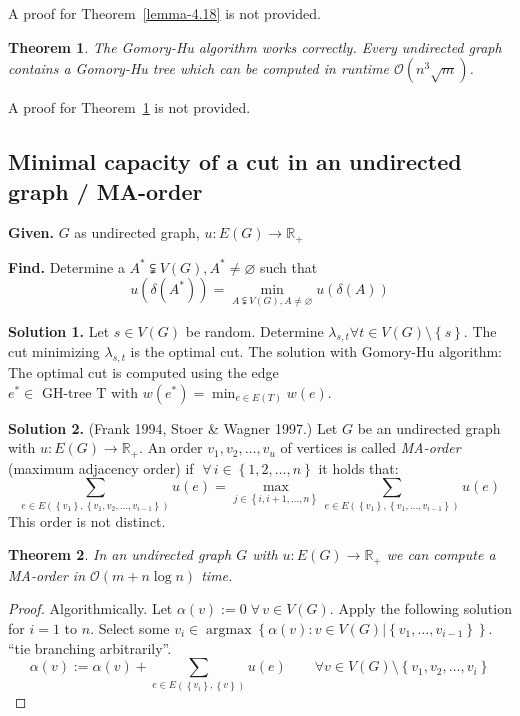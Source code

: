\documentclass{article}
\newtheorem{theorem}{Theorem}
\newcommand{\set}[1]{\left\{#1\right\}}
\newcommand{\given}[1]{\textbf{Given.} #1\par}
\newcommand{\find}[1]{\textbf{Find.} #1\par}
\newcommand{\fall}{\;\forall\,}
\newcommand{\noproof}[1]{A proof for Theorem~\ref{#1} is not provided.}
\DeclareMathOperator{\argmax}{argmax}
\begin{document}
\noproof{lemma-4.18}

\begin{theorem}\label{satz-4.19}
  The Gomory-Hu algorithm works correctly.
  Every undirected graph contains a Gomory-Hu tree which can be computed in runtime $\mathcal{O}(n^3 \sqrt{m})$.
\end{theorem}

\noproof{satz-4.19}

\subsection{Minimal capacity of a cut in an undirected graph / MA-order}

\given{$G$ as undirected graph, $u: E(G) \rightarrow \mathbb{R}_+$}
\find{
  Determine a $A^* \subsetneqq V(G), A^* \neq \diameter$ such that
  \[
    u(\delta(A^*)) = \min_{A \subsetneqq V(G), A \neq \diameter} u(\delta(A))
  \]
}

\textbf{Solution 1.}
  Let $s \in V(G)$ be random. Determine $\lambda_{s,t} \forall t \in V(G) \setminus \set{s}$.
  The cut minimizing $\lambda_{s,t}$ is the optimal cut.
  The solution with Gomory-Hu algorithm: The optimal cut is computed using the edge $e^* \in \text{ GH-tree T with } w(e^*) = \min_{e \in E(T)} w(e)$.

\textbf{Solution 2.}
  (Frank 1994, Stoer \& Wagner 1997.)
  Let $G$ be an undirected graph with $u: E(G) \rightarrow \mathbb{R}_+$.
  An order $v_1, v_2, \ldots, v_u$ of vertices is called \emph{MA-order} (maximum adjacency order)
  if $\fall i \in \set{1, 2, \ldots, n}$ it holds that:
  \[
    \sum_{e \in E(\set{v_1}, \set{v_1, v_2, \ldots, v_{i-1}})} u(e)
      = \max_{j \in \set{i, i+1, \ldots, n}} \sum_{e \in E(\set{v_1}, \set{v_1, \ldots, v_{i-1}})} u(e)
  \]
  This order is not distinct.

\begin{theorem}\label{proposition-4.20}
  In an undirected graph $G$ with $u: E(G) \rightarrow \mathbb{R}_+$ we can compute a MA-order in $\mathcal{O}(m + n\log{n})$ time.
\end{theorem}

\begin{proof}
  Algorithmically. Let $\alpha(v) := 0 \fall v \in V(G)$. Apply the following solution for $i = 1$ to $n$.
  Select some $v_i \in \argmax{\set{\alpha(v): v \in V(G) | \set{v_1, \ldots, v_{i-1}}}}$.
  ``tie branching arbitrarily''.
  \[
    \alpha(v) := \alpha(v) + \sum_{e \in E(\set{v_i}, \set{v})} u(e)
      \qquad\forall v \in V(G) \setminus \set{v_1, v_2, \ldots, v_i}
  \]
\end{proof}
\end{document}
